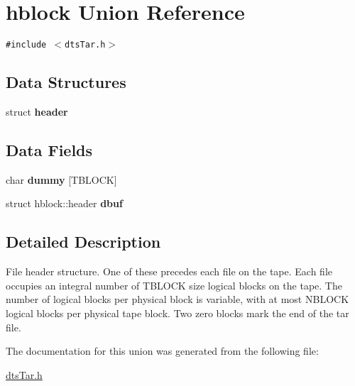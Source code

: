 \hypertarget{unionhblock}{
\section{hblock Union Reference}
\label{unionhblock}
}
{\tt \#include $<$dtsTar.h$>$}

\subsection*{Data Structures}
\begin{CompactItemize}
\item 
struct \textbf{header}
\end{CompactItemize}
\subsection*{Data Fields}
\begin{CompactItemize}
\item 
\hypertarget{unionhblock_5a0ac2dbb502fb4affcf97a747ff729c}{
char \textbf{dummy} \mbox{[}TBLOCK\mbox{]}}
\label{unionhblock_5a0ac2dbb502fb4affcf97a747ff729c}

\item 
\hypertarget{unionhblock_4fb666c7c94df451bc5429b7837df1b5}{
struct hblock::header \textbf{dbuf}}
\label{unionhblock_4fb666c7c94df451bc5429b7837df1b5}

\end{CompactItemize}


\subsection{Detailed Description}
File header structure. One of these precedes each file on the tape. Each file occupies an integral number of TBLOCK size logical blocks on the tape. The number of logical blocks per physical block is variable, with at most NBLOCK logical blocks per physical tape block. Two zero blocks mark the end of the tar file. 

The documentation for this union was generated from the following file:\begin{CompactItemize}
\item 
\hyperlink{dtsTar_8h}{dtsTar.h}\end{CompactItemize}
